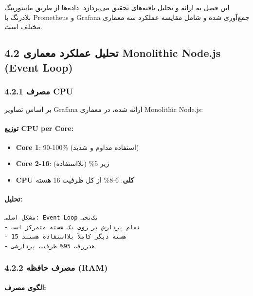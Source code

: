 \documentclass[
]{article}
\providecommand{\tightlist}{%
  \setlength{\itemsep}{0pt}\setlength{\parskip}{0pt}}
\begin{document}
این فصل به ارائه و تحلیل یافته‌های تحقیق می‌پردازد. داده‌ها از طریق
مانیتورینگ بلادرنگ با Prometheus و Grafana جمع‌آوری شده و شامل مقایسه
عملکرد سه معماری مختلف است.

\subsection{4.2 تحلیل عملکرد معماری Monolithic Node.js (Event
Loop)}\label{ux62aux62dux644ux6ccux644-ux639ux645ux644ux6a9ux631ux62f-ux645ux639ux645ux627ux631ux6cc-monolithic-node.js-event-loop}

\subsubsection{4.2.1 مصرف CPU}\label{ux645ux635ux631ux641-cpu}

بر اساس تصاویر Grafana ارائه شده، در معماری Monolithic Node.js:

\paragraph{توزیع CPU per
Core:}\label{ux62aux648ux632ux6ccux639-cpu-per-core}

\begin{itemize}
\tightlist
\item
  \textbf{Core 1}: 90-100\% (استفاده مداوم و شدید)
\item
  \textbf{Core 2-16}: زیر 5\% (بلااستفاده)
\item
  \textbf{CPU کلی}: 6-8\% از کل ظرفیت 16 هسته
\end{itemize}

\paragraph{تحلیل:}\label{ux62aux62dux644ux6ccux644}

\begin{verbatim}
مشکل اصلی: Event Loop تک‌نخی
- تمام پردازش بر روی یک هسته متمرکز است
- 15 هسته دیگر کاملاً بلااستفاده هستند
- هدررفت 95% ظرفیت پردازشی
\end{verbatim}

\subsubsection{4.2.2 مصرف حافظه
(RAM)}\label{ux645ux635ux631ux641-ux62dux627ux641ux638ux647-ram}

\paragraph{الگوی
مصرف:}\label{ux627ux644ux6afux648ux6cc-ux645ux635ux631ux641}
\end{document}
